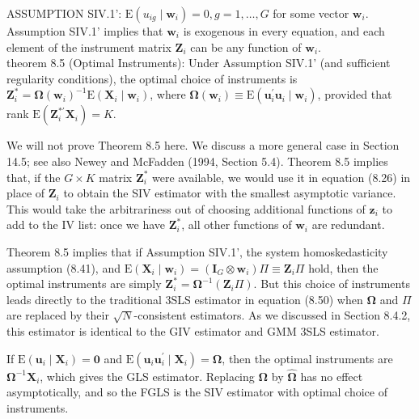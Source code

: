 \documentclass[10pt]{article}
\begin{document}
ASSUMPTION SIV.1': $\mathrm{E}\left(u_{i g} \mid \mathbf{w}_{i}\right)=0, g=1, \ldots, G$ for some vector $\mathbf{w}_{i}$.\\
Assumption SIV.1' implies that $\mathbf{w}_{i}$ is exogenous in every equation, and each element of the instrument matrix $\mathbf{Z}_{i}$ can be any function of $\mathbf{w}_{i}$.\\
theorem 8.5 (Optimal Instruments): Under Assumption SIV.1' (and sufficient regularity conditions), the optimal choice of instruments is $\mathbf{Z}_{i}^{*}=\mathbf{\Omega}\left(\mathbf{w}_{i}\right)^{-1} \mathrm{E}\left(\mathbf{X}_{i} \mid \mathbf{w}_{i}\right)$, where $\boldsymbol{\Omega}\left(\mathbf{w}_{i}\right) \equiv \mathrm{E}\left(\mathbf{u}_{i}^{\prime} \mathbf{u}_{i} \mid \mathbf{w}_{i}\right)$, provided that rank $\mathrm{E}\left(\mathbf{Z}_{i}^{* \prime} \mathbf{X}_{i}\right)=K$.

We will not prove Theorem 8.5 here. We discuss a more general case in Section 14.5; see also Newey and McFadden (1994, Section 5.4). Theorem 8.5 implies that, if the $G \times K$ matrix $\mathbf{Z}_{i}^{*}$ were available, we would use it in equation (8.26) in place of $\mathbf{Z}_{i}$ to obtain the SIV estimator with the smallest asymptotic variance. This would take the arbitrariness out of choosing additional functions of $\mathbf{z}_{i}$ to add to the IV list: once we have $\mathbf{Z}_{i}^{*}$, all other functions of $\mathbf{w}_{i}$ are redundant.

Theorem 8.5 implies that if Assumption SIV.1', the system homoskedasticity assumption (8.41), and $\mathrm{E}\left(\mathbf{X}_{i} \mid \mathbf{w}_{i}\right)=\left(\mathbf{I}_{G} \otimes \mathbf{w}_{i}\right) \Pi \equiv \mathbf{Z}_{i} \Pi$ hold, then the optimal instruments are simply $\mathbf{Z}_{i}^{*}=\boldsymbol{\Omega}^{-1}\left(\mathbf{Z}_{i} \Pi\right)$. But this choice of instruments leads directly to the traditional 3SLS estimator in equation (8.50) when $\boldsymbol{\Omega}$ and $\Pi$ are replaced by their $\sqrt{N}$-consistent estimators. As we discussed in Section 8.4.2, this estimator is identical to the GIV estimator and GMM 3SLS estimator.

If $\mathrm{E}\left(\mathbf{u}_{i} \mid \mathbf{X}_{i}\right)=\mathbf{0}$ and $\mathrm{E}\left(\mathbf{u}_{i} \mathbf{u}_{i}^{\prime} \mid \mathbf{X}_{i}\right)=\boldsymbol{\Omega}$, then the optimal instruments are $\boldsymbol{\Omega}^{-1} \mathbf{X}_{i}$, which gives the GLS estimator. Replacing $\boldsymbol{\Omega}$ by $\hat{\boldsymbol{\Omega}}$ has no effect asymptotically, and so the FGLS is the SIV estimator with optimal choice of instruments.
\end{document}
